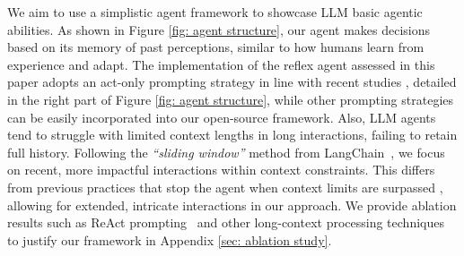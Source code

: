 We aim to use a simplistic agent framework to showcase LLM basic agentic abilities. As shown in Figure \ref{fig: agent structure}, our agent makes decisions based on its memory of past perceptions,
similar to how humans learn from experience and adapt. The implementation of the reflex agent assessed in this paper adopts an act-only prompting strategy in line with recent studies \citep{liu2023bolaa, zhou2023webarena, xu2023tool}, detailed in the right part of Figure \ref{fig: agent structure}, while other prompting strategies can be easily incorporated into our open-source framework. 
Also, LLM agents tend to struggle with limited context lengths in long interactions, failing to retain full history. Following the \textit{``sliding window''} method from LangChain~\citep{Chase_LangChain_2022}, we focus on recent, more impactful interactions \citep{puterman1990markov} within context constraints. This differs from previous practices that stop the agent when context limits are surpassed \citep{liu2023agentbench, wang2023mint}, allowing for extended, intricate interactions in our approach. We provide ablation results such as ReAct prompting~\citep{yao2022react} and other long-context processing techniques to justify our framework in Appendix \ref{sec: ablation study}.


